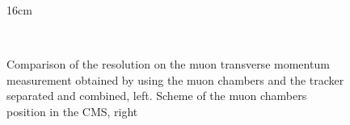 \begin{figure}[htbp]{16cm}
\caption{Comparison of the resolution on the muon transverse momentum measurement obtained by using the muon chambers and the tracker separated and combined, left. Scheme of the muon chambers position in the CMS, right}
\centering
{}\\
\label{fig:preso_detectors}
\end{figure}

